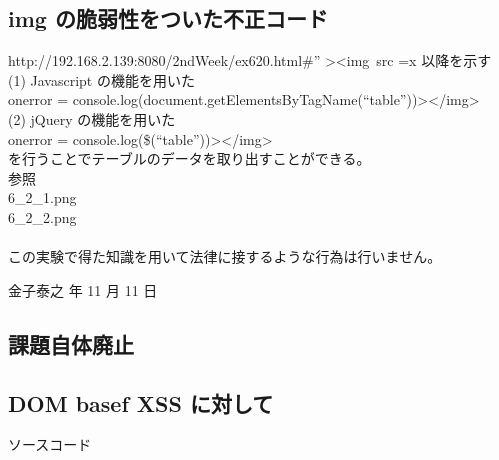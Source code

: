\documentclass[a4j]{jarticle}
\begin{document}
    \subsection{img の脆弱性をついた不正コード}
      http://192.168.2.139:8080/2ndWeek/ex620.html\#” \textgreater \textless img\ src =x 以降を示す\\
      (1) Javascript の機能を用いた\\
      onerror = console.log(document.getElementsByTagName(“table”))\textgreater \textless/img\textgreater\\
      (2) jQuery の機能を用いた\\
      onerror = console.log(\$(“table”))\textgreater \textless/img\textgreater \\
      を行うことでテーブルのデータを取り出すことができる。\\
      参照\\
      6\_2\_1.png\\
      6\_2\_2.png\\
      \vspace{2em}\\
      この実験で得た知識を用いて法律に接するような行為は行いません。
      \begin{flushright}
        金子泰之 年 11 月 11 日
      \end{flushright}
    \subsection{課題自体廃止}
    \subsection{DOM basef XSS に対して}

\newpage
{\rm \huge ソースコード}
  
  \newpage
  
  \newpage
  
  \newpage
  
  \newpage
  
  \newpage
  
  \newpage
  
  \newpage
  
  \newpage
  
  \newpage
\end{document}
